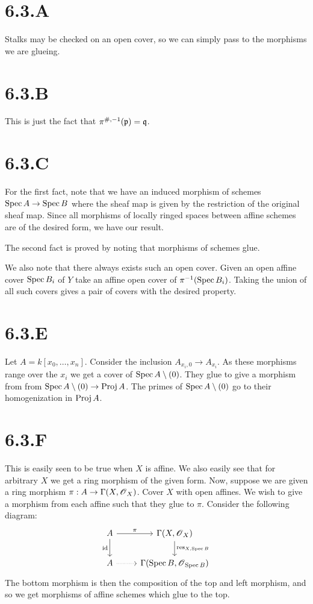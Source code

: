 \documentclass{article}
\begin{document}
\section{6.3.A}
Stalks may be checked on an open cover, so we can simply pass to the morphisms
we are glueing.

\section{6.3.B}
This is just the fact that $\pi^{\#,-1}(\mathfrak{p}) = \mathfrak{q}$.

\section{6.3.C}
For the first fact, note that we have an induced morphism of schemes
$\operatorname{Spec} A \to \operatorname{Spec} B$ where the sheaf map is given by the restriction of the
original sheaf map. Since all morphisms of locally ringed spaces between affine
schemes are of the desired form, we have our result.

The second fact is proved by noting that morphisms of schemes glue.

We also note that there always exists such an open cover. Given an open affine
cover $\operatorname{Spec} B_i$ of $Y$ take an affine open
cover of $\pi^{-1}(\operatorname{Spec} B_i)$. Taking the union of all such covers gives a
pair of covers with the desired property.

\section{6.3.E}
Let $A=k[x_0, \dots, x_n]$. Consider the inclusion $A_{x_i,0} \to A_{x_i}$. As
these morphisms range over the $x_i$ we get a cover of
$\operatorname{Spec} A \setminus (0)$. They glue to give a morphism from from
$\operatorname{Spec} A \setminus (0) \to \operatorname{Proj} A$. The primes of $\operatorname{Spec} A \setminus (0)$ go to their
homogenization in $\operatorname{Proj} A$.

\section{6.3.F}
This is easily seen to be true when $X$ is affine. We also
easily see that for arbitrary $X$ we get a ring morphism of
the given form. Now, suppose we are given a ring morphism
$\pi: A \to \Gamma(X, \operatorname{\mathscr{O}}_X)$. Cover $X$ with open affines. We wish
to give a morphism from each affine such that they glue to
$\pi$. Consider the following diagram: \[
    \begin{tikzcd}
        A \ar[r, "\pi"] \ar[d, "\text{id}", swap] & \Gamma(X, \Osh_X) \ar[d, "\operatorname{res}_{X, \Spec B}"] \\
        A \ar[r, dotted]                          & \Gamma(\Spec B, \Osh_{\Spec B})
    \end{tikzcd}
\]
The bottom morphism is then the composition of the top and left morphism, and
so we get morphisms of affine schemes which glue to the top.
\end{document}
